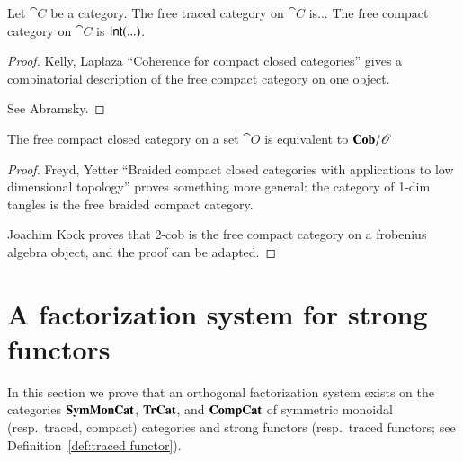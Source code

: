 \documentclass[12pt,oneside,article,draft]{memoir}
\begin{document}
\begin{proposition}\label{prop:free traced and compact}

Let $\cat{C}$ be a category. The free traced category on $\cat{C}$ is... The free compact category on $\cat{C}$ is $\mathsf{Int}(...)$.

\end{proposition}

\begin{proof}

Kelly, Laplaza ``Coherence for compact closed categories'' gives a combinatorial description of the free compact category on one object. 

See Abramsky. 

\end{proof}



\begin{proposition}\label{prop:free compact is Cob}

The free compact closed category on a set $\cat{O}$ is equivalent to $\mathbf{Cob}/\mathscr{O}$

\end{proposition}

\begin{proof}
Freyd, Yetter ``Braided compact closed categories with applications to low dimensional topology'' proves something more general: the category of 1-dim tangles is the free braided compact category. 

Joachim Kock proves that 2-cob is the free compact category on a frobenius algebra object, and the proof can be adapted.
\end{proof}


\section{A factorization system for strong functors}\label{sec:factorization system}

In this section we prove that an orthogonal factorization system exists on the categories $\mathbf{SymMonCat}$, $\mathbf{TrCat}$, and $\mathbf{CompCat}$ of symmetric monoidal (resp.\ traced, compact) categories and strong functors (resp.\ traced functors; see Definition~\ref{def:traced functor}). 
\end{document}
